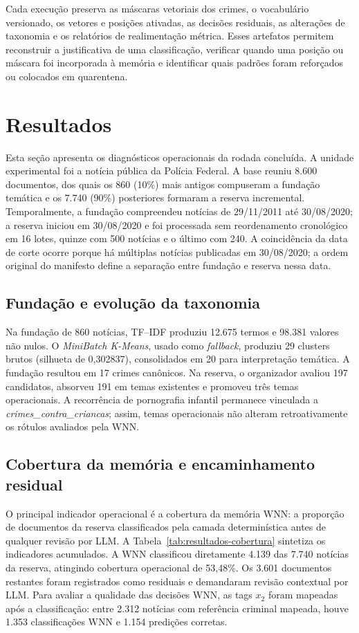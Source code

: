 Cada execução preserva as máscaras vetoriais dos crimes, o vocabulário versionado, os vetores e posições ativadas, as decisões residuais, as alterações de taxonomia e os relatórios de realimentação métrica. Esses artefatos permitem reconstruir a justificativa de uma classificação, verificar quando uma posição ou máscara foi incorporada à memória e identificar quais padrões foram reforçados ou colocados em quarentena.

\section{Resultados}

Esta seção apresenta os diagnósticos operacionais da rodada concluída. A unidade experimental foi a notícia pública da Polícia Federal. A base reuniu 8.600 documentos, dos quais os 860 (10\%) mais antigos compuseram a fundação temática e os 7.740 (90\%) posteriores formaram a reserva incremental. Temporalmente, a fundação compreendeu notícias de 29/11/2011 até 30/08/2020; a reserva iniciou em 30/08/2020 e foi processada sem reordenamento cronológico em 16 lotes, quinze com 500 notícias e o último com 240. A coincidência da data de corte ocorre porque há múltiplas notícias publicadas em 30/08/2020; a ordem original do manifesto define a separação entre fundação e reserva nessa data.

\subsection{Fundação e evolução da taxonomia}

Na fundação de 860 notícias, TF--IDF produziu 12.675 termos e 98.381 valores não nulos. O \textit{MiniBatch K-Means}, usado como \textit{fallback}, produziu 29 clusters brutos (silhueta de 0,302837), consolidados em 20 para interpretação temática. A fundação resultou em 17 crimes canônicos. Na reserva, o organizador avaliou 197 candidatos, absorveu 191 em temas existentes e promoveu três temas operacionais. A recorrência de pornografia infantil permanece vinculada a \textit{crimes\_contra\_criancas}; assim, temas operacionais não alteram retroativamente os rótulos avaliados pela WNN.

\subsection{Cobertura da memória e encaminhamento residual}

O principal indicador operacional é a cobertura da memória WNN: a proporção de documentos da reserva classificados pela camada determinística antes de qualquer revisão por LLM. A Tabela~\ref{tab:resultados-cobertura} sintetiza os indicadores acumulados. A WNN classificou diretamente 4.139 das 7.740 notícias da reserva, atingindo cobertura operacional de 53,48\%. Os 3.601 documentos restantes foram registrados como residuais e demandaram revisão contextual por LLM. Para avaliar a qualidade das decisões WNN, as tags $x_2$ foram mapeadas após a classificação: entre 2.312 notícias com referência criminal mapeada, houve 1.353 classificações WNN e 1.154 predições corretas.

